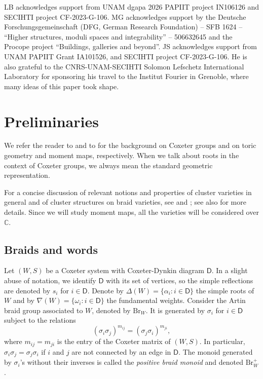 \documentclass[a4paper, 11pt]{amsart}
\newcommand{\Br}{\mathrm{Br}}
\newcommand{\dynkin}{\mathsf{D}}
\theoremstyle{definition}
\def\CC{\mathbb{C}}
\begin{document}
LB acknowledges support from UNAM dgapa 2026 PAPIIT project IN106126 and SECIHTI project CF-2023-G-106. 
MG acknowledges support by the Deutsche Forschungsgemeinschaft (DFG, German Research Foundation) – SFB 1624 – ``Higher structures, moduli spaces and integrability'' – 506632645 and the Procope project ``Buildings, galleries and beyond''.  JS acknowledges support from UNAM PAPIIT Grant IA101526, and SECIHTI project CF-2023-G-106. He is also grateful to the CNRS-UNAM-SECIHTI Solomon Lefschetz International Laboratory for sponsoring his travel to the Institut Fourier in Grenoble, where many ideas of this paper took shape.

\section{Preliminaries}\label{sec:preliminaries} 

We refer the reader to \cite{bb_coxeter} and to \cite{Cox_toric_book, Fulton} for the background on Coxeter groups and on toric geometry and moment maps, respectively. When we talk about roots in the context of Coxeter groups, we always mean the standard geometric representation.

For a concise discussion of relevant notions and properties of cluster varieties in general and of cluster structures on braid varieties, see \cite[Sections 2 and 4]{CGSS} and \cite{Tyler}; see also \cite{FWZ_123, FWZ_6, LamSpeyer-I} for more details.
Since we will study moment maps, all the varieties will be considered over $\CC$.  

\subsection{Braids and words}

Let $(W, S)$ be a Coxeter system with Coxeter-Dynkin diagram $\dynkin$. In a slight abuse of notation, we identify $\dynkin$ with its set of vertices, so the simple reflections are denoted by $s_i$ for $i \in \dynkin$. 
Denote by $\Delta(W)=\{\alpha_i:i\in \dynkin\}$ the simple roots of $W$ and by $\nabla(W)=\{\omega_i:i\in \dynkin\}$ the fundamental weights.
Consider the Artin braid group associated to $W$, denoted by $\Br_W$. It is generated by $\sigma_i$ for $i\in\mathsf{D}$ subject to the relations 
\[
(\sigma_i\sigma_j)^{m_{ij}}=(\sigma_j\sigma_i)^{m_{ji}},
\]
where $m_{ij} = m_{ji}$ is the entry of the Coxeter matrix of $(W, S)$. 
In particular, $\sigma_i\sigma_j=\sigma_j\sigma_i$ if $i$ and $j$ are not connected by an edge in $\dynkin$. The monoid generated by $\sigma_i$'s without their inverses is called the \emph{positive braid monoid} and denoted $\Br_W^+$.
\end{document}
